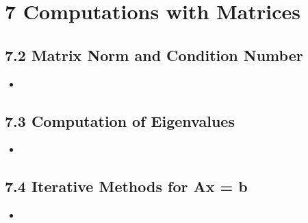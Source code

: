 \chapter{7 Computations with Matrices}

\section{7.2 Matrix Norm and Condition Number}
\begin{itemize}
  \item []


\end{itemize}

\section{7.3 Computation of Eigenvalues}
\begin{itemize}
  \item []


\end{itemize}

\section{7.4 Iterative Methods for Ax = b}
\begin{itemize}
  \item []


\end{itemize}


